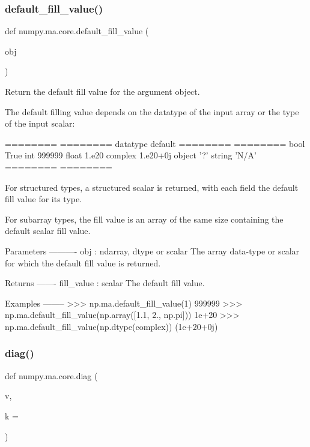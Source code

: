 \subsubsection{\texorpdfstring{default\+\_\+fill\+\_\+value()}{default\_fill\_value()}}
{\footnotesize\ttfamily def numpy.\+ma.\+core.\+default\+\_\+fill\+\_\+value (\begin{DoxyParamCaption}\item[{}]{obj }\end{DoxyParamCaption})}

\begin{DoxyVerb}Return the default fill value for the argument object.

The default filling value depends on the datatype of the input
array or the type of the input scalar:

   ========  ========
   datatype  default
   ========  ========
   bool      True
   int       999999
   float     1.e20
   complex   1.e20+0j
   object    '?'
   string    'N/A'
   ========  ========

For structured types, a structured scalar is returned, with each field the
default fill value for its type.

For subarray types, the fill value is an array of the same size containing
the default scalar fill value.

Parameters
----------
obj : ndarray, dtype or scalar
    The array data-type or scalar for which the default fill value
    is returned.

Returns
-------
fill_value : scalar
    The default fill value.

Examples
--------
>>> np.ma.default_fill_value(1)
999999
>>> np.ma.default_fill_value(np.array([1.1, 2., np.pi]))
1e+20
>>> np.ma.default_fill_value(np.dtype(complex))
(1e+20+0j)\end{DoxyVerb}
 \mbox{\label{namespacenumpy_1_1ma_1_1core_ac0e8938dbdc84e0aaeb80b38c549fe98}} 
\subsubsection{\texorpdfstring{diag()}{diag()}}
{\footnotesize\ttfamily def numpy.\+ma.\+core.\+diag (\begin{DoxyParamCaption}\item[{}]{v,  }\item[{}]{k = {} }\end{DoxyParamCaption})}

